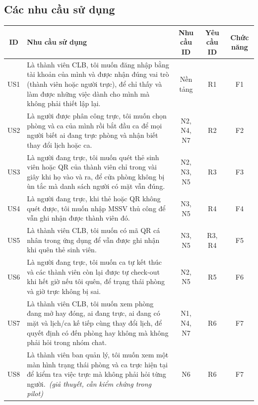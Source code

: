 \subsection{Các nhu cầu sử dụng}
\small
\setlength{\tabcolsep}{1.5pt}
{\centering
\begin{tabularx}{0.95\textwidth}{|c|X|c|c|c|}
\hline
\textbf{ID} & \textbf{Nhu cầu sử dụng} & \textbf{Nhu cầu ID} & \textbf{Yêu cầu ID} & \textbf{Chức năng} \\ \hline
US1 & Là thành viên CLB, tôi muốn đăng nhập bằng tài khoản của mình và được nhận đúng vai trò (thành viên hoặc người trực), để chỉ thấy và làm được những việc dành cho mình mà không phải thiết lập lại. & Nền tảng & R1 & F1 \\ \hline
US2 & Là người được phân công trực, tôi muốn chọn phòng và ca của mình rồi bắt đầu ca để mọi người biết ai đang trực phòng và nhận biết thay đổi lịch hoặc ca. & N2, N4, N7 & R2 & F2 \\ \hline
US3 & Là người đang trực, tôi muốn quét thẻ sinh viên hoặc QR của thành viên chỉ trong vài giây khi họ vào và ra, để cửa phòng không bị ùn tắc mà danh sách người có mặt vẫn đúng. & N2, N3, N5 & R3 & F3 \\ \hline
US4 & Là người đang trực, khi thẻ hoặc QR không quét được, tôi muốn nhập MSSV thủ công để vẫn ghi nhận được thành viên đó. & N3, N5 & R4 & F4 \\ \hline
US5 & Là thành viên CLB, tôi muốn có mã QR cá nhân trong ứng dụng để vẫn được ghi nhận khi quên thẻ sinh viên. & N3, N5 & R3, R4 & F5 \\ \hline
US6 & Là người đang trực, tôi muốn ca tự kết thúc và các thành viên còn lại được tự check-out khi hết giờ nếu tôi quên, để trạng thái phòng và giờ trực không bị sai. & N2, N5 & R5 & F6 \\ \hline
US7 & Là thành viên CLB, tôi muốn xem phòng đang mở hay đóng, ai đang trực, ai đang có mặt và lịch/ca kế tiếp cùng thay đổi lịch, để quyết định có đến phòng hay không mà không phải hỏi trong nhóm chat. & N1, N4, N7 & R6 & F7 \\ \hline
US8 & Là thành viên ban quản lý, tôi muốn xem một màn hình trạng thái phòng và ca trực hiện tại để kiểm tra việc trực mà không phải hỏi từng người.\ \emph{(giả thuyết, cần kiểm chứng trong pilot)} & N6 & R6 & F7 \\ \hline
\end{tabularx}\par}
\normalsize

